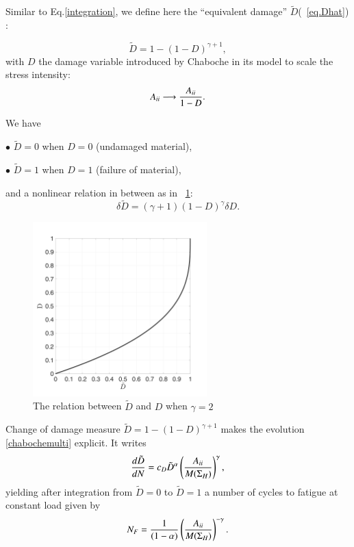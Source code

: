 \documentclass[3p,times,procedia,number]{elsarticle}
\newcommand{\figref}[1]{\figurename~\ref{#1}}
\begin{document}
Similar to Eq.\eqref{integration}, we define here the ``equivalent damage'' $\tilde{D}$(\figref{eq.Dhat}) :

\begin{equation}
\tilde{D}=1-(1-D)^{\gamma+1},
\label{eq.Dhat}
\end{equation}
with $D$ the damage variable introduced by Chaboche in its model to scale the stress intensity:
$${A}_{\uppercase\expandafter{\romannumeral2}} \longrightarrow \dfrac{{A}_{\uppercase\expandafter{\romannumeral2}}}{1-D}.$$

We have 

$\bullet$ $\tilde{D}=0$ when $D=0$ (undamaged material),

$\bullet$ $\tilde{D}=1$ when $D=1$ (failure of material),	

and a nonlinear relation in between as in \figref{fig.Dhat}:
$$\delta\tilde{D}=\left(\gamma+1 \right)\left( 1-D\right)^\gamma \delta D.$$	
\begin{figure}
\centering
\includegraphics[width=0.6\textwidth]{figures//Dhat.png} 
\caption{The relation between $\tilde{D}$ and $D$ when $\gamma=2$}
\label{fig.Dhat}
\end{figure}

Change of damage measure $\tilde{D} = 1 - (1-D)^{\gamma+1}$ makes the evolution \eqref{chabochemulti} explicit. It writes
\begin{equation}
\dfrac{d\tilde{D}}{dN} = c_D {\tilde{D}}^\alpha \left(\dfrac{{A}_{\uppercase\expandafter{\romannumeral2}}}{M(\Sigma_{H})} \right) ^\gamma,
\label{eq.diffchaboche}
\end{equation}
yielding after integration from $\tilde{D}=0$ to $\tilde{D}=1$  a number of cycles to fatigue at constant load given by
$$
N_F =\dfrac{1}{(1-\alpha)}\left(\dfrac{{A}_{\uppercase\expandafter{\romannumeral2}}}{M(\Sigma_{H})} \right) ^{-\gamma}.
$$
\end{document}
